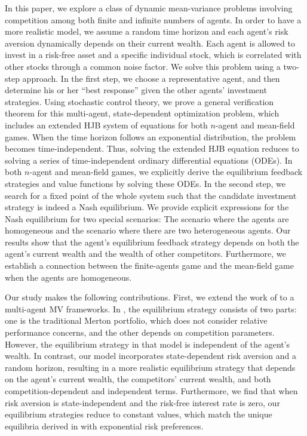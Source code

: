 \documentclass[11pt]{article}
\numberwithin{equation}{section}
\begin{document}
In this paper, we explore a class of dynamic mean-variance problems involving competition among both finite and infinite numbers of agents. In order to have a more realistic model, we assume a random time horizon and each agent's risk aversion dynamically depends on their current wealth. Each agent is allowed to invest in a risk-free asset and a specific individual stock, which is correlated with other stocks through a common noise factor. We solve this problem using a two-step approach. In the first step, we choose a representative agent, and then determine his or her ``best response'' given the other agents' investment strategies. Using stochastic control theory, we prove a general verification theorem for this multi-agent, state-dependent optimization problem, which includes an extended HJB system of equations for both $n$-agent and mean-field games. When the time horizon follows an exponential distribution, the problem becomes time-independent. Thus, solving the extended HJB equation reduces to solving a series of time-independent ordinary differential equations (ODEs).  In both $n$-agent and mean-field games, we explicitly derive the equilibrium feedback strategies and value functions by solving these ODEs. In the second step, we search for a fixed point of the whole system such that the candidate investment strategy is indeed a Nash equilibrium. We provide explicit expressions for the Nash equilibrium for two special scenarios: The scenario where the agents are homogeneous and the scenario where there are two heterogeneous agents. Our results show that the agent's equilibrium feedback strategy depends on both the agent's current wealth and the wealth of other competitors. Furthermore, we establish a connection between the finite-agents game and the mean-field game when the agents are homogeneous.

Our study makes the following contributions. First, we extend the work of \citet{lacker2019mean} to a multi-agent MV frameworks. In \citet{lacker2019mean}, the equilibrium strategy consists of two parts: one is the traditional Merton portfolio, which does not consider relative performance concerns, and the other depends on competition parameters. However, the equilibrium strategy in that model is independent of the agent's wealth. In contrast, our model incorporates state-dependent risk aversion and a random horizon, resulting in a more realistic equilibrium strategy that depends on the agent's current wealth, the competitors' current wealth, and both competition-dependent and independent terms. Furthermore, we find that when risk aversion is state-independent and the risk-free interest rate is zero, our equilibrium strategies reduce to constant values, which match the unique equilibria derived in \citet{lacker2019mean} with exponential risk preferences.
\end{document}
